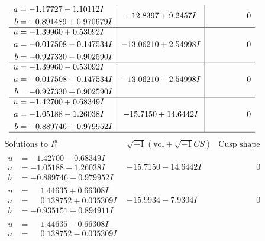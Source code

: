 \documentclass[1p]{elsarticle_modified}
\theoremstyle{definition}
\newcommand{\I}{\sqrt{-1}}
\begin{document}
$$\begin{array}{c|c|c}
\begin{aligned}
a &= -1.17727 - 1.10112 I \\
b &= -0.891489 + 0.970679 I\end{aligned}
 & -12.8397 + 9.2457 I & \phantom{-0.000000 } 0 \\ \hline\begin{aligned}
u &= -1.39960 + 0.53092 I \\
a &= -0.017508 - 0.147534 I \\
b &= -0.927330 - 0.902590 I\end{aligned}
 & -13.06210 + 2.54998 I & \phantom{-0.000000 } 0 \\ \hline\begin{aligned}
u &= -1.39960 - 0.53092 I \\
a &= -0.017508 + 0.147534 I \\
b &= -0.927330 + 0.902590 I\end{aligned}
 & -13.06210 - 2.54998 I & \phantom{-0.000000 } 0 \\ \hline\begin{aligned}
u &= -1.42700 + 0.68349 I \\
a &= -1.05188 - 1.26038 I \\
b &= -0.889746 + 0.979952 I\end{aligned}
 & -15.7150 + 14.6442 I & \phantom{-0.000000 } 0\\
 \hline 
 \end{array}$$\newpage$$\begin{array}{c|c|c}  
\text{Solutions to }I^u_{1}& \I (\text{vol} + \sqrt{-1}CS) & \text{Cusp shape}\\
 \hline 
\begin{aligned}
u &= -1.42700 - 0.68349 I \\
a &= -1.05188 + 1.26038 I \\
b &= -0.889746 - 0.979952 I\end{aligned}
 & -15.7150 - 14.6442 I & \phantom{-0.000000 } 0 \\ \hline\begin{aligned}
u &= \phantom{-}1.44635 + 0.66308 I \\
a &= \phantom{-}0.138752 + 0.035309 I \\
b &= -0.935151 + 0.894911 I\end{aligned}
 & -15.9934 - 7.9304 I & \phantom{-0.000000 } 0 \\ \hline\begin{aligned}
u &= \phantom{-}1.44635 - 0.66308 I \\
a &= \phantom{-}0.138752 - 0.035309 I \\

\end{aligned}
\end{array}$$
\end{document}
